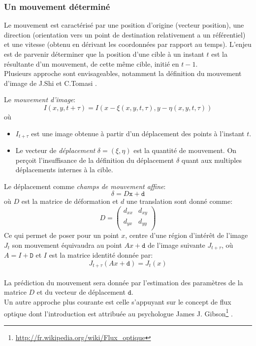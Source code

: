 \documentclass[a4paper,12pt]{report}
\begin{document}
\subsubsection{Un mouvement déterminé}		
	Le mouvement est caractérisé par une position d'origine (vecteur position), une direction (orientation vers un point de destination relativement a un référentiel) et une vitesse (obtenu en dérivant les coordonnées par rapport au temps).	
	L'enjeu est de parvenir déterminer que la position d'une cible à un instant $t$ est la résultante d'un mouvement, de cette même cible, initié en $t-1$.\\
	
	Plusieurs approche sont envisageables, notamment la définition du mouvement d'image de J.Shi et C.Tomasi .
	
	Le \textit{mouvement d'image}:
	$$I(x,y,t+\tau)=I(x-\xi(x,y,t,\tau),y-\eta(x,y,t,\tau))$$
	où
	\begin{itemize}
	\item[] $I_{t+\tau}$ est une image obtenue à partir d'un déplacement des points à l'instant $t$.
	\item[] Le vecteur de \textit{déplacement} $\delta = (\xi,\eta)$ est la quantité de mouvement. On perçoit l'insuffisance de la définition du déplacement $\delta$ quant aux multiples déplacements internes à la cible.\\
	\end{itemize}
	Le déplacement comme \textit{champs de mouvement affine}:
	$$\delta = D\texttt{x}+\texttt{d}$$
	où
	$D$ est la matrice de déformation et $d$ une translation sont donné comme:
	$$ D = \left( 
		\begin{array}{cc}
		d_{xx} & d_{xy} \\
		d_{yx} & d_{yy} \\ 
		\end{array} 
		   \right)
	$$
	Ce qui permet de poser pour un point $x$, centre d'une région d'intérêt de l'image $J_t$ son mouvement équivaudra au point $Ax + \texttt{d}$ de l'image suivante $J_{t+\tau}$, où $A = I + \texttt{D}$ et $I$ est la matrice identité donnée par:$$J_{t+\tau}(Ax + \texttt{d}) = J_t(x)$$\\
	La prédiction du mouvement sera donnée par l'estimation des paramètres de la matrice $D$ et du vecteur de déplacement $\texttt{d}$.\\
	
	
	
	Un autre approche plus courante est celle s'appuyant sur le concept de flux optique dont l'introduction est attribuée au psychologue James J. Gibson\footnote{\url{http://fr.wikipedia.org/wiki/Flux_optique}} . 
	
\end{document}
